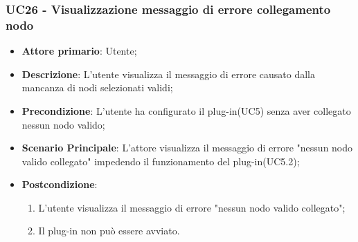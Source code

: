 \subsubsection{UC26 - Visualizzazione messaggio di errore collegamento nodo}
\label{sssec:uc26}
\begin{itemize}
  \item \textbf{Attore primario}: Utente;
  \item \textbf{Descrizione}: L'utente visualizza il messaggio di errore causato dalla mancanza di nodi selezionati validi;
  \item \textbf{Precondizione}: L'utente ha configurato il plug-in(UC5) senza aver collegato nessun nodo valido;
  \item \textbf{Scenario Principale}: L'attore visualizza il messaggio di errore "nessun nodo valido collegato" impedendo il funzionamento del plug-in(UC5.2);
  \item \textbf{Postcondizione}:
  \begin{enumerate}
		\item L'utente visualizza il messaggio di errore "nessun nodo valido collegato";
		\item Il plug-in non può essere avviato.
	\end{enumerate}
\end{itemize}
